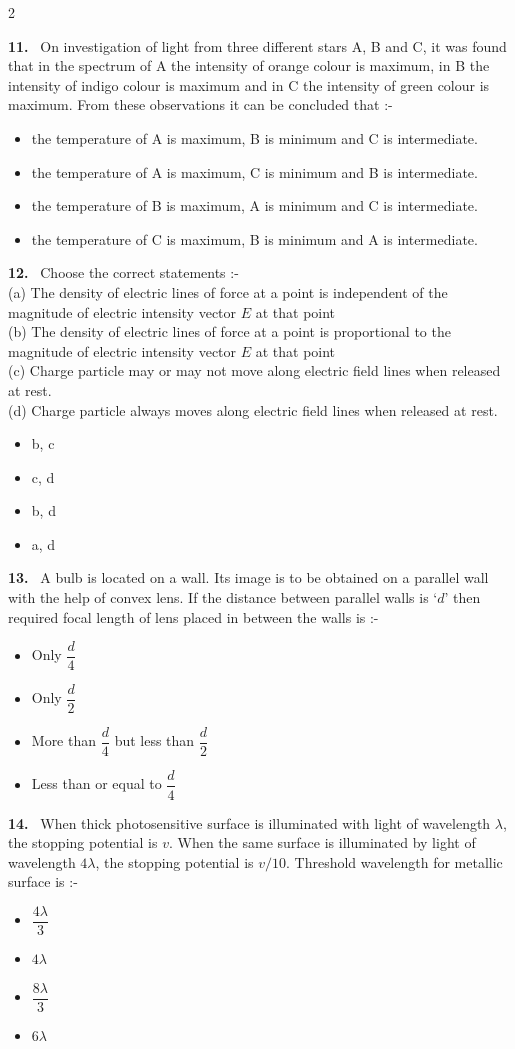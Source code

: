 \documentclass[10pt]{extarticle}
\newcommand{\qn}[1]{\par\smallskip\noindent\textbf{#1.}~}
\newenvironment{qoptions}{\begin{itemize}[leftmargin=1.8em,itemsep=1pt,topsep=2pt,label={}]}{\end{itemize}}
\newcommand{\opt}[2]{\item[(#1)] #2}
\begin{document}
\begin{multicols}{2}
\qn{11} On investigation of light from three different stars A, B and C, it was found that in the spectrum of A the intensity of orange colour is maximum, in B the intensity of indigo colour is maximum and in C the intensity of green colour is maximum. From these observations it can be concluded that :-
\begin{qoptions}
\opt{A}{the temperature of A is maximum, B is minimum and C is intermediate.}
\opt{B}{the temperature of A is maximum, C is minimum and B is intermediate.}
\opt{C}{the temperature of B is maximum, A is minimum and C is intermediate.}
\opt{D}{the temperature of C is maximum, B is minimum and A is intermediate.}
\end{qoptions}

\qn{12} Choose the correct statements :-\\
(a) The density of electric lines of force at a point is independent of the magnitude of electric intensity vector $E$ at that point\\
(b) The density of electric lines of force at a point is proportional to the magnitude of electric intensity vector $E$ at that point\\
(c) Charge particle may or may not move along electric field lines when released at rest.\\
(d) Charge particle always moves along electric field lines when released at rest.
\begin{qoptions}
\opt{A}{b, c}
\opt{B}{c, d}
\opt{C}{b, d}
\opt{D}{a, d}
\end{qoptions}

\qn{13} A bulb is located on a wall. Its image is to be obtained on a parallel wall with the help of convex lens. If the distance between parallel walls is `$d$' then required focal length of lens placed in between the walls is :-
\begin{qoptions}
\opt{A}{Only $\dfrac d4$}
\opt{B}{Only $\dfrac d2$}
\opt{C}{More than $\dfrac d4$ but less than $\dfrac d2$}
\opt{D}{Less than or equal to $\dfrac d4$}
\end{qoptions}

\qn{14} When thick photosensitive surface is illuminated with light of wavelength $\lambda$, the stopping potential is $v$. When the same surface is illuminated by light of wavelength $4\lambda$, the stopping potential is $v/10$. Threshold wavelength for metallic surface is :-
\begin{qoptions}
\opt{A}{$\dfrac{4\lambda}{3}$}
\opt{B}{$4\lambda$}
\opt{C}{$\dfrac{8\lambda}{3}$}
\opt{D}{$6\lambda$}
\end{qoptions}


\end{multicols}
\end{document}
